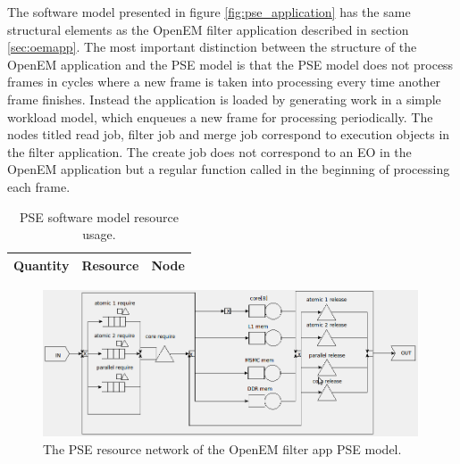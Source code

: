 The software model presented in figure \ref{fig:pse_application} has the same
structural elements as the OpenEM filter application described in section
\ref{sec:oemapp}. The most important distinction between the structure of the
OpenEM application and the PSE model is that the PSE model does not process
frames in cycles where a new frame is taken into processing every time another
frame finishes. Instead the application is loaded by generating work in a
simple workload model, which enqueues a new frame for processing periodically.
The nodes titled read job, filter job and merge job correspond to execution
objects in the filter application. The create job does not correspond to an EO
in the OpenEM application but a regular function called in the beginning of
processing each frame.

\begin{table}
    \begin{center}
        \begin{tabular}{| c | c | c |}
            \hline
            Quantity & Resource & Node \\ \hline
        \end{tabular}
        \caption{PSE software model resource usage.}
        \label{tab:pse_resources}
    \end{center}
\end{table}

\begin{figure}[h!]
    \begin{center}
        \includegraphics[width=0.99\textwidth]{images/pse_hardware.png}
        \caption{The PSE resource network of the OpenEM filter app PSE
        model.}
        \label{fig:pse_hardware}
    \end{center}
\end{figure}

